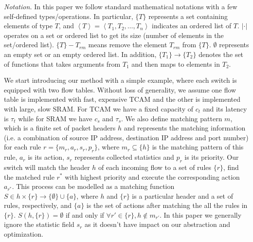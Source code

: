 \documentclass[10pt,twocolumn,letterpaper]{article}
\begin{document}
\textit{Notation.} In this paper we follow standard mathematical notations with a few self-defined types/operations. In particular, $\{T\}$ represents a set containing elements of type $T$, and $\left< T \right> = \left< T_1, T_2, \ldots, T_n \right> $ indicates an ordered list of $T$. $|\cdot|$ operates on a set or ordered list to get its size (number of elements in the set/ordered list). $\{T\} - T_{rm}$ means remove the element $T_{rm}$ from $\{T\}$.   $\emptyset$ represents an empty set or an empty ordered list. In addition, $\{T_1\} \to \{T_2\}$ denotes the set of functions that takes arguments from ${T_1}$ and then maps to elements in ${T_2}$.

We start introducing our method with a simple example, where each switch is equipped with two flow tables. Without loss of generality, we assume one flow table is implemented with fast, expensive TCAM and the other is implemented with large, slow SRAM. For TCAM we have a fixed capacity of $c_t$ and its latency is $\tau_t$ while for SRAM we have $c_s$ and $\tau_s$. We also define matching pattern $m$, which is a finite set of packet headers $h$ and represents the matching information (i.e. a combination of source IP address, destination IP address and port number) for each rule $r=\{m_r, a_r, s_r, p_r\}$, where $m_r \subseteq \{h\}$ is the matching pattern of this rule, $a_r$ is its action, $s_r$ represents collected statistics and $p_r$ is its priority. Our switch will match the header $h$ of each incoming flow to a set of rules $\{r\}$, find the matched rule $r^*$ with highest priority and execute the corresponding action $a_{r^*}$. This process can be modelled as a matching function $S \in h \times \{r\} \to \{\emptyset\}\cup \{a\}$, where $h$ and $\{r\}$ is a particular header and a set of rules, respectively, and $\{a\}$ is the set of  actions after matching the all the rules in $\{r\}$.  $S(h,\{r\})=\emptyset$ if and only if $\forall r' \in \{r\}, h\not\in m_{r'}$. In this paper we generally ignore the statistic field $s_r$ as it doesn't have impact on our abstraction and optimization. 
\end{document}
